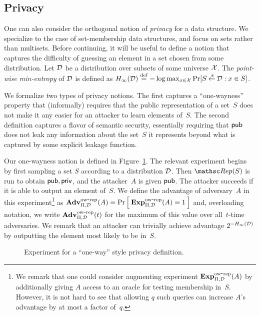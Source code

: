 \subsection{Privacy}

One can also consider the orthogonal notion of \emph{privacy} for a data structure.
We specialize to the case of set-membership data structures, and
focus on sets rather than multisets. Before continuing, it will be useful to define a notion that captures the difficulty
of guessing an element in a set chosen from some distribution.
Let ${\cal D}$ be a distribution over subsets of some universe ${\cal X}$. The \emph{point-wise
min-entropy} of ${\cal D}$ is defined as
$H_\infty({\cal D}) \stackrel{\rm def}{=} -\log \max_{x \in {\cal X}} \Pr[S {\:\stackrel{{\scriptscriptstyle \hspace{0.2em}\$}} {\leftarrow}\:} {\cal D} : x \in S]$.

We formalize two types of privacy notions. The first captures
a ``one-wayness'' property that (informally) requires that
the public representation of a set~$S$ does not make it any easier for an attacker
to learn elements of~$S$.  The second definition
captures a flavor of semantic security, essentially requiring that ${\sf pub}$ does
not leak any information about the set~$S$ it represents beyond
what is captured by some explicit leakage function.

Our one-wayness notion is defined in Figure~\ref{fig:privacy-ow}.
The relevant experiment begins by first sampling a set $S$ according to a distribution
${\cal D}$. Then $\Rep(S)$ is run to obtain ${\sf pub},{\sf priv}$, and the attacker~$A$ is given
${\sf pub}$. The attacker succeeds if it is able to output an element of~$S$.
We define the advantage of adversary~$A$ in this experiment\footnote{We
remark that one could consider augmenting experiment $\mathrm{\mathbf{Exp}}^{\mathrm{ow\mbox{-}rep}}_{\Pi,{\cal D}}(A)$ by additionally
giving $A$ access to an oracle for testing membership in~$S$. However, it is not hard
to see that allowing $q$ such queries can increase $A$'s advantage by at most a factor of~$q$.} as
$\mathrm{\mathbf{Adv}}^{\mathrm{ow\mbox{-}rep}}_{\Pi,\mathcal{D}}(A) = \Pr\left[\: \mathrm{\mathbf{Exp}}^{\mathrm{ow\mbox{-}rep}}_{\Pi,{\cal D}}(A)=1 \:\right]$ and,
overloading notation, we write $\mathrm{\mathbf{Adv}}^{\mathrm{ow\mbox{-}rep}}_{\Pi,{\cal D}}(t)$ for the maximum of this value over
all~$t$-time adversaries.
We remark that an attacker can trivially achieve advantage
$2^{-H_\infty({\cal D})}$ by outputting the element most likely to be in~$S$.

\begin{figure}[tp]
\centering
{}
\caption{Experiment for a ``one-way'' style privacy
  definition.}
\label{fig:privacy-ow}
\end{figure}


